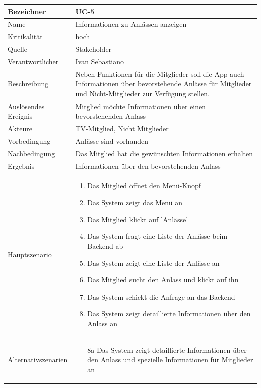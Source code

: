 \begin{table}[ht]
\centering
  \begin{tabular}{ l | p{10cm} }
	\hline
	\rowcolor{gray}
	Bezeichner		&	UC-5\\ \hline
	Name			&	Informationen zu Anlässen anzeigen\\ \hline
	Kritikalität		&	hoch\\ \hline
	Quelle			&	Stakeholder\\ \hline
	Verantwortlicher	&	Ivan Sebastiano\\ \hline
	Beschreibung	&	Neben Funktionen für die Mitglieder soll die App auch Informationen über bevorstehende Anlässe für Mitglieder und Nicht-Mitglieder zur Verfügung stellen.\\ \hline
	Auslösendes Ereignis&	Mitglied möchte Informationen über einen bevorstehenden Anlass\\ \hline
	Akteure		&	TV-Mitglied, Nicht Mitglieder\\ \hline
	Vorbedingung	&	Anlässe sind vorhanden\\ \hline
	Nachbedingung	&	Das Mitglied hat die gewünschten Informationen erhalten\\ \hline
	Ergebnis		&	Informationen über den bevorstehenden Anlass\\ \hline
	Hauptszenario	&	\begin{enumerate}
					\item Das Mitglied öffnet den Menü-Knopf
					\item Das System zeigt das Menü an
					\item Das Mitglied klickt auf 'Anlässe'
					\item Das System fragt eine Liste der Anlässe beim Backend ab
					\item Das System zeigt eine Liste der Anlässe an
					\item Das Mitglied sucht den Anlass und klickt auf ihn
					\item Das System schickt die Anfrage an das Backend
					\item Das System zeigt detaillierte Informationen über den Anlass an
					\end{enumerate}
					\\ \hline
	Alternativszenarien	&	\begin{enumerate}
					\item[8a] Das System zeigt detaillierte Informationen über den Anlass und spezielle Informationen für Mitglieder an
					\end{enumerate}
					\\ \hline

\end{tabular}
\end{table}
